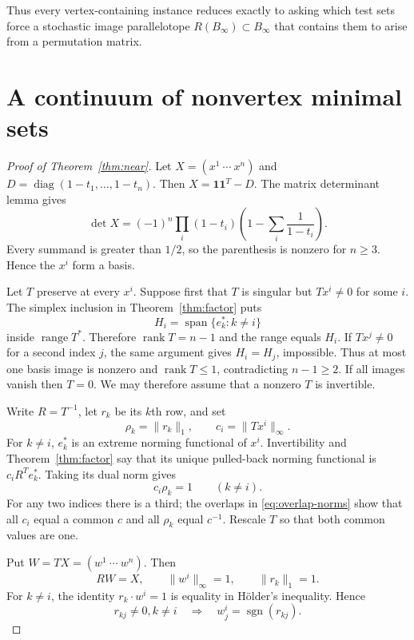 \documentclass[11pt]{article}
\theoremstyle{definition}
\theoremstyle{remark}
\newcommand{\Span}{\operatorname{span}}
\newcommand{\diag}{\operatorname{diag}}
\newcommand{\sgn}{\operatorname{sgn}}
\newcommand{\one}{\mathbf 1}
\begin{document}
Thus every vertex-containing instance reduces exactly to asking which test
sets force a stochastic image parallelotope $R(B_\infty)\subset B_\infty$
that contains them to arise from a permutation matrix.

\section{A continuum of nonvertex minimal sets}

\begin{proof}[Proof of Theorem~\ref{thm:near}]
Let $X=(x^1\ \cdots\ x^n)$ and
$D=\diag(1-t_1,\ldots,1-t_n)$.  Then $X=\one\one^T-D$.  The matrix
determinant lemma gives
\begin{equation}\label{eq:near-det}
 \det X=(-1)^n\prod_i(1-t_i)
 \left(1-\sum_i\frac1{1-t_i}\right).
\end{equation}
Every summand is greater than $1/2$, so the parenthesis is nonzero for
$n\geq3$.  Hence the $x^i$ form a basis.

Let $T$ preserve at every $x^i$.  Suppose first that $T$ is singular but
$Tx^i\neq0$ for some $i$.  The simplex inclusion in
Theorem~\ref{thm:factor} puts
\[
 H_i=\Span\{e_k^*:k\neq i\}
\]
inside $\operatorname{range}T^*$.  Therefore $\operatorname{rank}T=n-1$
and the range equals $H_i$.  If $Tx^j\neq0$ for a second index $j$, the same
argument gives $H_i=H_j$, impossible.  Thus at most one basis image is
nonzero and $\operatorname{rank}T\leq1$, contradicting $n-1\geq2$.  If all
images vanish then $T=0$.  We may therefore assume that a nonzero $T$ is
invertible.

Write $R=T^{-1}$, let $r_k$ be its $k$th row, and set
\[
 \rho_k=\|r_k\|_1,\qquad c_i=\|Tx^i\|_\infty.
\]
For $k\neq i$, $e_k^*$ is an extreme norming functional of $x^i$.
Invertibility and Theorem~\ref{thm:factor} say that its unique pulled-back
norming functional is $c_iR^Te_k^*$.  Taking its dual norm gives
\begin{equation}\label{eq:overlap-norms}
 c_i\rho_k=1\qquad(k\neq i).
\end{equation}
For any two indices there is a third; the overlaps in
\eqref{eq:overlap-norms} show that all $c_i$ equal a common $c$ and all
$\rho_k$ equal $c^{-1}$.  Rescale $T$ so that both common values are one.

Put $W=TX=(w^1\ \cdots\ w^n)$.  Then
\[
 RW=X,\qquad \|w^i\|_\infty=1,\qquad \|r_k\|_1=1.
\]
For $k\neq i$, the identity $r_k\cdot w^i=1$ is equality in H\"older's
inequality.  Hence
\begin{equation}\label{eq:holder-sign}
 r_{kj}\neq0, k\neq i
 \quad\Longrightarrow\quad w^i_j=\sgn(r_{kj}).
\end{equation}


\end{proof}
\end{document}
